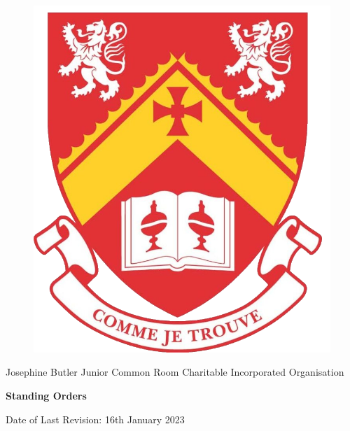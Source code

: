 \begin{titlepage}
    \AddToShipoutPicture*{\BackgroundPic}
    
    \begin{figure}[t]
    \includegraphics[scale=0.8]{Functional/Josephine_Butler_College_Crest.png}
    \centering
    \end{figure}
    
        \vspace*{1.0cm}    
        \begin{center}
            \begin{tcolorbox}[colback=red!5!white,colframe=red!75!black,text width=13cm]
                \begin{center}
                    
                    Josephine Butler Junior Common Room Charitable Incorporated Organisation
                    
                    \vspace{1cm}
                    
                    \textbf{\Huge{\color{myred}Standing Orders}}
                    
                    \vspace{1cm}
                    
                    Date of Last Revision: 16th January 2023
                    
                    \vfill
                \end{center}
            \end{tcolorbox}
        \end{center}
\end{titlepage}
